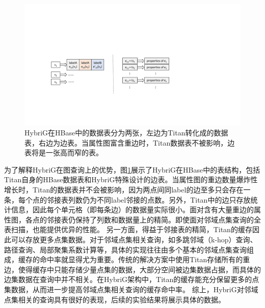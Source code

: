 \begin{figure}[htbp]
\centering
\includegraphics[width=150mm]{fig/curr_list.pdf}
\caption{HybriG在HBase中的数据表分为两张，左边为Titan转化成的数据表，右边为边表。当属性图富含重边时，Titan数据表不被影响，边表将是一张高而窄的表。}
\label{fig:curr_list}
\end{figure}

为了解释HybriG在图查询上的优势，图\ref{fig:curr_list}展示了HybriG在HBase中的表结构，包括Titan自身的HBase数据表和HybriG特殊设计的边表。当属性图的重边数量爆炸性增长时，Titan的数据表并不会被影响，因为两点间同label的边至多只会存在一条，每个点的邻接表列数仍为不同label邻接的点数。另外，Titan中的边只存放统计信息，因此每个单元格（即每条边）的数据量实际很小。面对含有大量重边的属性图，各点的邻接表仍保持了列数和数据量上的精简。即使面对邻域点集查询的全表扫描，也能提供优异的性能。
另一方面，得益于邻接表的精简，Titan的缓存因此可以存放更多点集数据。对于邻域点集相关查询，如多跳邻域（k-hop）查询、路径查询、局部聚集系数计算等，具体的实现往往由多个基本的邻域点集查询组成，缓存的命中率就显得尤为重要。传统的解决方案中使用Titan存储所有的重边，使得缓存中只能存储少量点集的数据，大部分空间被边集数据占据，而具体的边集数据在查询中并不相关。在HybriG架构中，Titan的缓存能充分保留更多的点集数据，从而进一步提高邻域点集相关查询的缓存命中率。
综上，HybriG对邻域点集相关的查询具有很好的表现，后续的实验结果将展示具体的数据。

